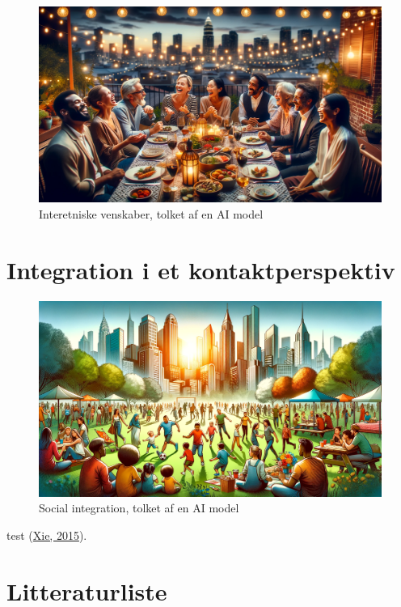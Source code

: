 \documentclass[
]{book}
\begin{document}
\begin{figure}
\includegraphics[width=1\linewidth]{images/dalle-friendships} \caption{Interetniske venskaber, tolket af en AI model}\label{fig:fig-friendships}
\end{figure}

\hypertarget{kap7}{%
\chapter{Integration i et kontaktperspektiv}\label{kap7}}

\begin{figure}
\includegraphics[width=1\linewidth]{images/dalle-integration} \caption{Social integration, tolket af en AI model}\label{fig:fig-integration}
\end{figure}

test (\protect\hyperlink{ref-xie2015}{Xie, 2015}).

\hypertarget{litteraturliste}{%
\chapter*{Litteraturliste}\label{litteraturliste}}
\end{document}
